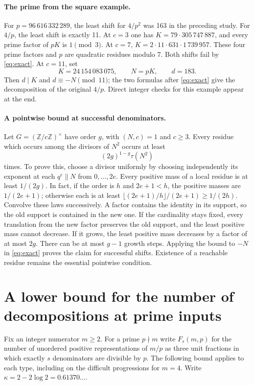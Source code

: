 \documentclass[a4paper,11pt]{article}
\begin{document}
\paragraph{The prime from the square example.}
For $p=96\,616\,332\,289$, the least shift for $4/p^2$ was 163 in the preceding study. For $4/p$, the least shift is exactly 11. At $c=3$ one has $K=79\cdot305\,747\,887$, and every prime factor of $pK$ is $1\pmod3$. At $c=7$, $K=2\cdot11\cdot631\cdot1\,739\,957$. These four prime factors and $p$ are quadratic residues modulo 7. Both shifts fail by \eqref{eq:exact}. At $c=11$, set
\[
 K=24\,154\,083\,075,\qquad N=pK,\qquad d=183 .
\]
Then $d\mid K$ and $d\equiv-N\pmod{11}$; the two formulas after \eqref{eq:exact} give the decomposition of the original $4/p$. Direct integer checks for this example appear at the end.

\paragraph{A pointwise bound at successful denominators.}
Let $G=(\mathbb Z/c\mathbb Z)^\times$ have order $g$, with $(N,c)=1$ and $c\ge3$. Every residue which occurs among the divisors of $N^2$ occurs at least
\[
 (2g)^{1-g}\tau(N^2)
\]
times. To prove this, choose a divisor uniformly by choosing independently its exponent at each $q^e\parallel N$ from $0,\ldots,2e$. Every positive mass of a local residue is at least $1/(2g)$. In fact, if the order is $h$ and $2e+1<h$, the positive masses are $1/(2e+1)$; otherwise each is at least $\lfloor(2e+1)/h\rfloor/(2e+1)\ge 1/(2h)$. Convolve these laws successively. A factor contains the identity in its support, so the old support is contained in the new one. If the cardinality stays fixed, every translation from the new factor preserves the old support, and the least positive mass cannot decrease. If it grows, the least positive mass decreases by a factor of at most $2g$. There can be at most $g-1$ growth steps. Applying the bound to $-N$ in \eqref{eq:exact} proves the claim for successful shifts. Existence of a reachable residue remains the essential pointwise condition.


\clearpage\section{A lower bound for the number of decompositions at prime inputs}
\label{sec:mult}
Fix an integer numerator $m\ge2$. For a prime $p\nmid m$ write $F_s(m,p)$
for the number of unordered positive representations of $m/p$ as three
unit fractions in which exactly $s$ denominators are divisible by $p$.
The following bound applies to each type, including on the difficult
progressions for $m=4$. Write $\kappa=2-2\log 2=0.61370\ldots$.
\end{document}
